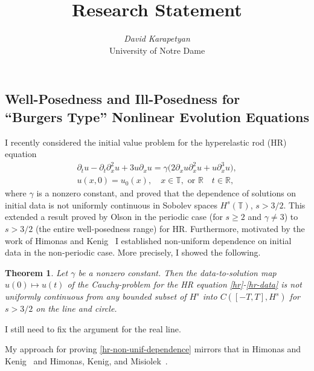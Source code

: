 \documentclass[12pt,reqno]{amsart}
\newcommand{\rr}{\mathbb{R}}
\newcommand{\ci}{\mathbb{T}}
\newcommand{\p}{\partial}
\newtheorem{theorem}{Theorem}
\begin{document}
\title{Research Statement} 
\author{{\it David Karapetyan}\\
University of Notre Dame}
\maketitle


\parindent0in
\parskip0.1in
%
%
%
\setcounter{section}{0}
\subsection{Well-Posedness and Ill-Posedness for \\``Burgers Type'' Nonlinear Evolution Equations}
I recently considered the initial value problem for
the hyperelastic rod (HR) equation
%
%
\begin{gather}
\label{hr}
\p_t u
-
\p_t \p_x^2 u
+
3u\p_x u
=
\gamma \big (
2\p_x u \p_x^2 u
+
u \p_x^3 u
\big ),
\\
\label{hr-data} u(x, 0) = u_0 (x),
\quad x  \in \ci, \text{  or  } \rr \quad t \in \rr,
\end{gather}
%
%
where $\gamma$  is a  nonzero constant,
and proved that the dependence of solutions on initial data is not uniformly 
continuous in Sobolev spaces $H^s(\ci)$, $s>3/2$.
This extended a result proved by Olson 
\cite{Olson_2006_Non-uniform-dep} in the periodic
case (for $s\ge 2$ and $\gamma \ne 3$)  to  $s>3/2$ (the entire well-posedness
range) for HR. Furthermore, motivated by the work of Himonas and
Kenig~\cite{Himonas:2009fk}
I established non-uniform dependence on initial data
in the non-periodic case. More precisely, I showed the following. 
%
%
\begin{theorem}
\label{hr-non-unif-dependence}
Let $\gamma$ be a nonzero constant. Then 
the data-to-solution map $u(0) \mapsto u(t)$ of the Cauchy-problem
for the HR equation
\eqref{hr}-\eqref{hr-data}
is not uniformly continuous
from any bounded subset of  $H^s$ into $C([-T, T], H^s)$
for $s>3/2$ on the line and circle. %
\end{theorem}
%
\begin{framed}
I still need to fix the argument for the real line.
\end{framed}
%
My approach for proving \autoref{hr-non-unif-dependence}  
mirrors that in Himonas and Kenig~\cite{Himonas:2009fk} and 
Himonas, Kenig, and Misiolek~\cite{Himonas_2009_Non-uniform-dep-per}.
\end{document}
